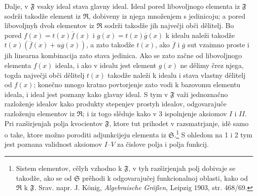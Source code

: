 \documentclass[11pt]{article}
\providecommand{\mR}{\mathfrak{R}}
\providecommand{\mS}{\mathfrak{S}}
\providecommand{\mF}{\mathfrak{F}}
\begin{document}
Dalje, v $\mF$ vsaky ideal stava glavny ideal. Ideal pored libovoljnogo elementa iz $\mF$ sodrži takodže element iz $\mR$, dobiveny iz njega množenjem s jedinicoju; a pored libovoljnyh dvoh elementov iz $\mR$ sodrži takodže jih največji obči dělitelj. Bo pored $f(x)=t(x)\overline f(x)$ i $g(x)=t(x)\overline g(x)$ k idealu naleži takodže $t(x)(\overline f(x)+u\overline g(x))$, a zato takodže $t(x)$, ako $\overline f$ i $\overline g$ sut vzaimno proste i jih linearna kombinacija zato stava jedinica. Ako se zato začne od libovoljnogo elementa $f(x)$ ideala, i ako v idealu jest element $g(x)$ ne dělimy črez njega, togda največji obči dělitelj $t(x)$ takodže naleži k idealu i stava vlastny dělitelj od $f(x)$; konečno mnogo kratno povtorjenje zato vodi k bazovomu elementu ideala, i ideal jest poznany kako glavny ideal. S tym v $\mF$ važi jednoznačno razloženje idealov kako produkty stepenjev prostyh idealov, odgovarajuče razloženju elementov iz $\mR$; i iz togo slěduje kako v 3 ispolnjenje aksiomov $I$ i $II$. Pri razširjenjah polja kvocientov $\mF$, ktore tut prihodet v razsmatrjanje, idě samo o take, ktore možno poroditi adjunkcijeju elementa iz $\mS$.\footnote{Sistem elementov, cělyh vzhodno k $\mF$, v tyh razširjenjah polj dobivaje se takodže, ako se od $\mS$ prěhodi k odgovarajučej funkcionalnoj oblasti, kako od $\mR$ k $\mF$. Srav. napr. J. König, \emph{Algebraische Größen}, Leipzig 1903, str. 468/69.} S ohledom na 1 i 2 tym jest poznana validnost aksiomov $I$--$V$ za čislove polja i polja funkcij.
\end{document}
